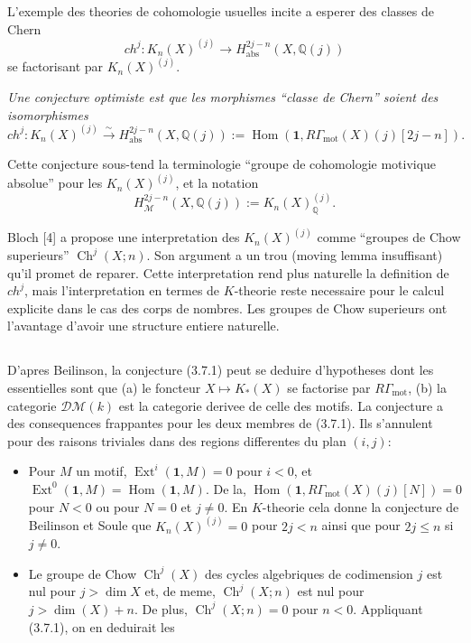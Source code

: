 \documentclass[11pt,a4paper]{article}
\theoremstyle{plain}
\theoremstyle{definition}
\DeclareMathOperator{\Ext}{Ext}
\DeclareMathOperator{\Hom}{Hom}
\DeclareMathOperator{\Ch}{Ch}
\newcommand{\Q}{\mathbb{Q}}
\DeclareMathOperator{\mot}{mot}
\newcommand{\abs}{\mathrm{abs}}
\begin{document}
L'exemple des theories de cohomologie usuelles incite a esperer des classes de Chern
$$
ch^j: K_n(X)^{(j)} \to H^{2j-n}_{\abs}(X, \Q(j))
$$
se factorisant par $K_n(X)^{(j)}$.

\textit{Une conjecture optimiste est que les morphismes ``classe de Chern'' soient des isomorphismes}
\begin{equation}
\tag{3.7.1}
ch^j: K_n(X)^{(j)} \xrightarrow{\sim} H^{2j-n}_{\abs}(X, \Q(j)) := \Hom(\mathbf{1}, R\Gamma_{\mot}(X)(j)[2j-n]).
\end{equation}

Cette conjecture sous-tend la terminologie ``groupe de cohomologie motivique absolue'' pour les $K_n(X)^{(j)}$, et la notation
$$
H^{2j-n}_{\mathcal{M}}(X, \Q(j)) := K_n(X)^{(j)}_{\Q}.$$

Bloch [4] a propose une interpretation des $K_n(X)^{(j)}$ comme ``groupes de Chow superieurs'' $\Ch^j(X; n)$. Son argument a un trou (moving lemma insuffisant) qu'il promet de reparer. Cette interpretation rend plus naturelle la definition de $ch^j$, mais l'interpretation en termes de $K$-theorie reste necessaire pour le calcul explicite dans le cas des corps de nombres. Les groupes de Chow superieurs ont l'avantage d'avoir une structure entiere naturelle.

\subsection{}

D'apres Beilinson, la conjecture (3.7.1) peut se deduire d'hypotheses dont les essentielles sont que (a) le foncteur $X \mapsto K_*(X)$ se factorise par $R\Gamma_{\mot}$, (b) la categorie $\mathscr{D}\mathcal{M}(k)$ est la categorie derivee de celle des motifs. La conjecture a des consequences frappantes pour les deux membres de (3.7.1). Ils s'annulent pour des raisons triviales dans des regions differentes du plan $(i, j)$:

\begin{itemize}
\item[(a)] Pour $M$ un motif, $\Ext^i(\mathbf{1}, M) = 0$ pour $i < 0$, et $\Ext^0(\mathbf{1}, M) = \Hom(\mathbf{1}, M)$. De la, $\Hom(\mathbf{1}, R\Gamma_{\mot}(X)(j)[N]) = 0$ pour $N < 0$ ou pour $N = 0$ et $j \neq 0$. En $K$-theorie cela donne la conjecture de Beilinson et Soule que $K_n(X)^{(j)} = 0$ pour $2j < n$ ainsi que pour $2j \leq n$ si $j \neq 0$.

\item[(b)] Le groupe de Chow $\Ch^j(X)$ des cycles algebriques de codimension $j$ est nul pour $j > \dim X$ et, de meme, $\Ch^j(X; n)$ est nul pour $j > \dim(X) + n$. De plus, $\Ch^j(X; n) = 0$ pour $n < 0$. Appliquant (3.7.1), on en deduirait les
\end{itemize}
\end{document}
